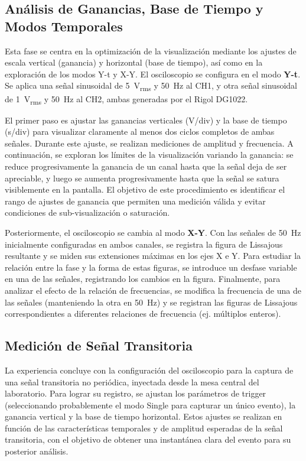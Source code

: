 \subsection{Análisis de Ganancias, Base de Tiempo y Modos Temporales}
Esta fase se centra en la optimización de la visualización mediante los ajustes de escala vertical (ganancia) y horizontal (base de tiempo), así como en la exploración de los modos Y-t y X-Y. El osciloscopio se configura en el modo \textbf{Y-t}. Se aplica una señal sinusoidal de \SI{5}{\volt_{rms}} y \SI{50}{\hertz} al CH1, y otra señal sinusoidal de \SI{1}{\volt_{rms}} y \SI{50}{\hertz} al CH2, ambas generadas por el Rigol DG1022.

El primer paso es ajustar las ganancias verticales (V/div) y la base de tiempo (s/div) para visualizar claramente al menos dos ciclos completos de ambas señales. Durante este ajuste, se realizan mediciones de amplitud y frecuencia. A continuación, se exploran los límites de la visualización variando la ganancia: se reduce progresivamente la ganancia de un canal hasta que la señal deja de ser apreciable, y luego se aumenta progresivamente hasta que la señal se satura visiblemente en la pantalla. El objetivo de este procedimiento es identificar el rango de ajustes de ganancia que permiten una medición válida y evitar condiciones de sub-visualización o saturación.

Posteriormente, el osciloscopio se cambia al modo \textbf{X-Y}. Con las señales de \SI{50}{\hertz} inicialmente configuradas en ambos canales, se registra la figura de Lissajous resultante y se miden sus extensiones máximas en los ejes X e Y. Para estudiar la relación entre la fase y la forma de estas figuras, se introduce un desfase variable en una de las señales, registrando los cambios en la figura. Finalmente, para analizar el efecto de la relación de frecuencias, se modifica la frecuencia de una de las señales (manteniendo la otra en \SI{50}{\hertz}) y se registran las figuras de Lissajous correspondientes a diferentes relaciones de frecuencia (ej. múltiplos enteros).

\subsection{Medición de Señal Transitoria}
La experiencia concluye con la configuración del osciloscopio para la captura de una señal transitoria no periódica, inyectada desde la mesa central del laboratorio. Para lograr su registro, se ajustan los parámetros de trigger (seleccionando probablemente el modo Single para capturar un único evento), la ganancia vertical y la base de tiempo horizontal. Estos ajustes se realizan en función de las características temporales y de amplitud esperadas de la señal transitoria, con el objetivo de obtener una instantánea clara del evento para su posterior análisis.